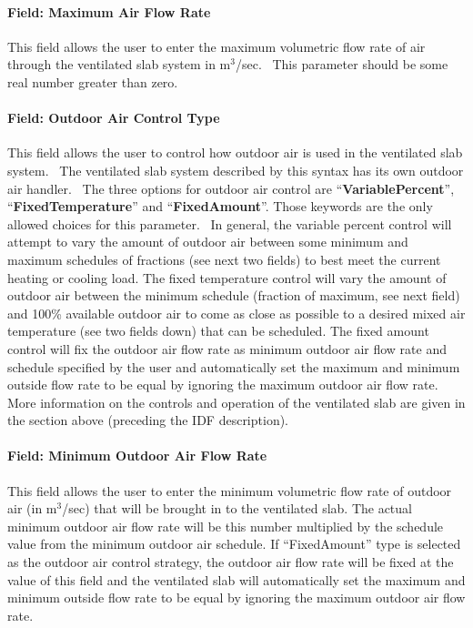 \paragraph{Field: Maximum Air Flow Rate}\label{field-maximum-air-flow-rate-001}

This field allows the user to enter the maximum volumetric flow rate of air through the ventilated slab system in m\(^{3}\)/sec.~ This parameter should be some real number greater than zero.

\paragraph{Field: Outdoor Air Control Type}\label{field-outdoor-air-control-type}

This field allows the user to control how outdoor air is used in the ventilated slab system.~ The ventilated slab system described by this syntax has its own outdoor air handler.~ The three options for outdoor air control are ``\textbf{VariablePercent}'', ``\textbf{FixedTemperature}'' and ``\textbf{FixedAmount}''. Those keywords are the only allowed choices for this parameter.~ In general, the variable percent control will attempt to vary the amount of outdoor air between some minimum and maximum schedules of fractions (see next two fields) to best meet the current heating or cooling load. The fixed temperature control will vary the amount of outdoor air between the minimum schedule (fraction of maximum, see next field) and 100\% available outdoor air to come as close as possible to a desired mixed air temperature (see two fields down) that can be scheduled. The fixed amount control will fix the outdoor air flow rate as minimum outdoor air flow rate and schedule specified by the user and automatically set the maximum and minimum outside flow rate to be equal by ignoring the maximum outdoor air flow rate. More information on the controls and operation of the ventilated slab are given in the section above (preceding the IDF description).

\paragraph{Field: Minimum Outdoor Air Flow Rate}\label{field-minimum-outdoor-air-flow-rate-001}

This field allows the user to enter the minimum volumetric flow rate of outdoor air (in m\(^{3}\)/sec) that will be brought in to the ventilated slab. The actual minimum outdoor air flow rate will be this number multiplied by the schedule value from the minimum outdoor air schedule. If ``FixedAmount'' type is selected as the outdoor air control strategy, the outdoor air flow rate will be fixed at the value of this field and the ventilated slab will automatically set the maximum and minimum outside flow rate to be equal by ignoring the maximum outdoor air flow rate.

